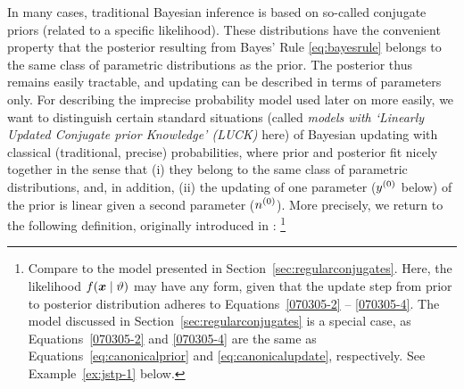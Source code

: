In many cases, traditional Bayesian inference is based on so-called
conjugate priors (related to a specific likelihood). These
distributions have the convenient property that the posterior
resulting from Bayes' Rule \eqref{eq:bayesrule} belongs to the same class of parametric
distributions as the prior. The posterior thus remains easily
tractable, and updating can be described in terms of parameters
only. For describing the imprecise probability model used later on more easily, we want to
distinguish certain standard situations (called
\emph{models with `Linearly Updated Conjugate prior Knowledge'
(LUCK)} here) of Bayesian updating with classical (traditional, precise)
probabilities, where prior and posterior fit nicely together in the sense that
(i) they belong to the same class of parametric distributions, and, in addition,
(ii) the updating of one parameter ($y^{(0)}$ below) of the prior is
linear given a second parameter ($n^{(0)}$).
More precisely, we return to the following definition,
originally introduced in \textcite{Walter2007a}:%
\footnote{Compare to the model presented in Section~\ref{sec:regularconjugates}.
Here, the likelihood $f({\bm x}\mid\vartheta)$ may have any form,
given that the update step from prior to posterior distribution
adheres to Equations~\eqref{070305-2} -- \eqref{070305-4}.
The model discussed in Section~\ref{sec:regularconjugates} is a special case,
as Equations~\eqref{070305-2} and \eqref{070305-4} are the same as
Equations~\eqref{eq:canonicalprior} and \eqref{eq:canonicalupdate}, respectively.
See Example~\ref{ex:jstp-1} below.}

